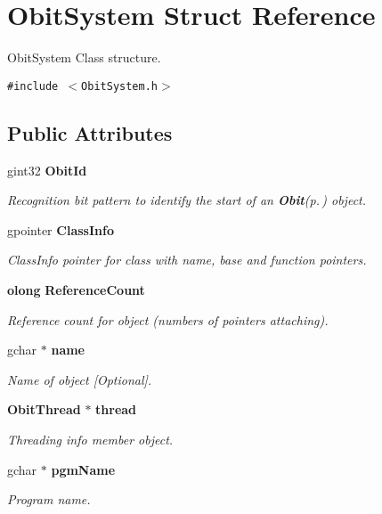\section{Obit\-System Struct Reference}
\label{structObitSystem}
Obit\-System Class structure.  


{\tt \#include $<$Obit\-System.h$>$}

\subsection*{Public Attributes}
\begin{CompactItemize}
\item 
gint32 {\bf Obit\-Id}
\begin{CompactList}\small\item\em Recognition bit pattern to identify the start of an {\bf Obit}{\rm (p.\,\pageref{structObit})} object. \item\end{CompactList}\item 
gpointer {\bf Class\-Info}
\begin{CompactList}\small\item\em Class\-Info pointer for class with name, base and function pointers. \item\end{CompactList}\item 
{\bf olong} {\bf Reference\-Count}
\begin{CompactList}\small\item\em Reference count for object (numbers of pointers attaching). \item\end{CompactList}\item 
gchar $\ast$ {\bf name}
\begin{CompactList}\small\item\em Name of object [Optional]. \item\end{CompactList}\item 
{\bf Obit\-Thread} $\ast$ {\bf thread}
\begin{CompactList}\small\item\em Threading info member object. \item\end{CompactList}\item 
gchar $\ast$ {\bf pgm\-Name}
\begin{CompactList}\small\item\em Program name. \item\end{CompactList}\item 

\end{CompactItemize}
